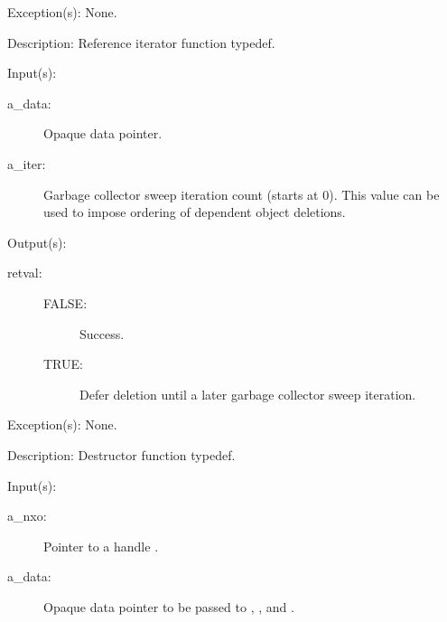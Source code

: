 \begin{capi}
\begin{capilist}
	\item[Exception(s): ] None.
	\item[Description: ]
		Reference iterator function typedef.
	\end{capilist}
\label{cw_nxo_handle_delete_t}
	\begin{capilist}
	\item[Input(s): ]
		\begin{description}\item[]
		\item[a\_data: ]
			Opaque data pointer.
		\item[a\_iter: ]
			Garbage collector sweep iteration count (starts at 0).
			This value can be used to impose ordering of dependent
			object deletions.
		\end{description}
	\item[Output(s): ]
		\begin{description}\item[]
		\item[retval: ]
			\begin{description}\item[]
			\item[FALSE: ] Success.
			\item[TRUE: ] Defer deletion until a later garbage
			collector sweep iteration.
			\end{description}
		\end{description}
	\item[Exception(s): ] None.
	\item[Description: ]
		Destructor function typedef.
	\end{capilist}
\label{nxo_handle_new}
	\begin{capilist}
	\item[Input(s): ]
		\begin{description}\item[]
		\item[a\_nxo: ]
			Pointer to a handle .
		\item[a\_data: ]
			Opaque data pointer to be passed to ,
			, and .

\end{description}
\end{capilist}
\end{capi}
